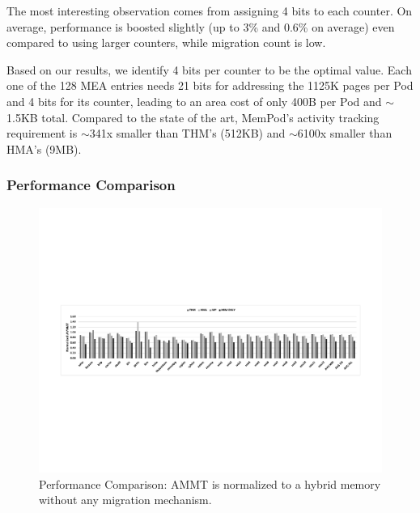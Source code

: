 The most interesting observation comes from assigning 4 bits to each counter. On average, performance is boosted slightly (up to 3\% and 0.6\% on average) even compared to using larger counters, while migration count is low. %



Based on our results, we identify 4 bits per counter to be the optimal value. Each one of the 128 MEA entries needs 21 bits for addressing the 1125K pages per Pod and 4 bits for its counter, leading to an area cost of only 400B per Pod and $\sim$1.5KB total. Compared to the state of the art, MemPod's activity tracking requirement is $\sim$341x smaller than THM's (512KB) and $\sim$6100x smaller than HMA's (9MB).

\subsubsection{Performance Comparison}
\label{sub:performance}

\begin{figure}[t]
  \includegraphics[width=\textwidth]{figures/performance_over_nlm.pdf}
  \caption{Performance Comparison: AMMT is normalized to a hybrid memory without any migration mechanism.}
  \label{fig:performance}
\end{figure}

